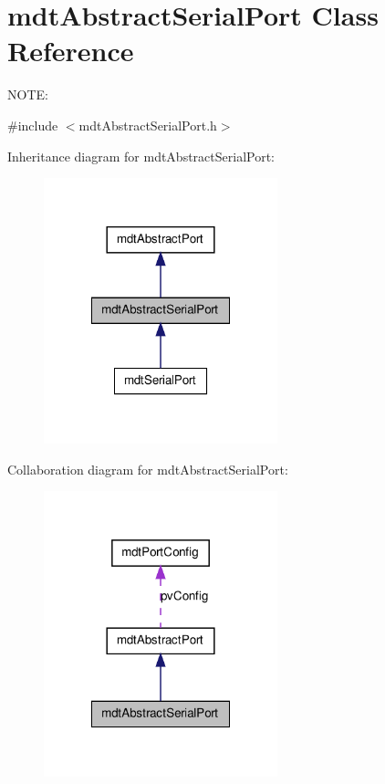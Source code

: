 \hypertarget{classmdt_abstract_serial_port}{
\section{mdtAbstractSerialPort Class Reference}
\label{classmdt_abstract_serial_port}
}


NOTE:  




{\ttfamily \#include $<$mdtAbstractSerialPort.h$>$}



Inheritance diagram for mdtAbstractSerialPort:\nopagebreak
\begin{figure}[H]
\begin{center}
\leavevmode
\includegraphics[width=192pt]{classmdt_abstract_serial_port__inherit__graph}
\end{center}
\end{figure}


Collaboration diagram for mdtAbstractSerialPort:\nopagebreak
\begin{figure}[H]
\begin{center}
\leavevmode
\includegraphics[width=192pt]{classmdt_abstract_serial_port__coll__graph}
\end{center}
\end{figure}
